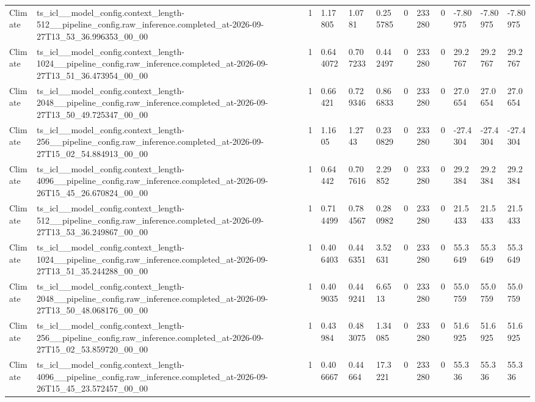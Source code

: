 \begin{tabular}{llllllllllll}
Climate & ts\_icl\_\_model\_config.context\_length-512\_\_pipeline\_config.raw\_inference.completed\_at-2026-09-27T13\_53\_36.996353\_00\_00 & 1 & 1.17805 & 1.0781 & 0.255785 & 0 & 233280 & 0 & -7.80975 & -7.80975 & -7.80975 \\
Climate & ts\_icl\_\_model\_config.context\_length-1024\_\_pipeline\_config.raw\_inference.completed\_at-2026-09-27T13\_51\_36.473954\_00\_00 & 1 & 0.644072 & 0.707233 & 0.442497 & 0 & 233280 & 0 & 29.2767 & 29.2767 & 29.2767 \\
Climate & ts\_icl\_\_model\_config.context\_length-2048\_\_pipeline\_config.raw\_inference.completed\_at-2026-09-27T13\_50\_49.725347\_00\_00 & 1 & 0.66421 & 0.729346 & 0.866833 & 0 & 233280 & 0 & 27.0654 & 27.0654 & 27.0654 \\
Climate & ts\_icl\_\_model\_config.context\_length-256\_\_pipeline\_config.raw\_inference.completed\_at-2026-09-27T15\_02\_54.884913\_00\_00 & 1 & 1.1605 & 1.2743 & 0.230829 & 0 & 233280 & 0 & -27.4304 & -27.4304 & -27.4304 \\
Climate & ts\_icl\_\_model\_config.context\_length-4096\_\_pipeline\_config.raw\_inference.completed\_at-2026-09-26T15\_45\_26.670824\_00\_00 & 1 & 0.64442 & 0.707616 & 2.29852 & 0 & 233280 & 0 & 29.2384 & 29.2384 & 29.2384 \\
Climate & ts\_icl\_\_model\_config.context\_length-512\_\_pipeline\_config.raw\_inference.completed\_at-2026-09-27T13\_53\_36.249867\_00\_00 & 1 & 0.714499 & 0.784567 & 0.280982 & 0 & 233280 & 0 & 21.5433 & 21.5433 & 21.5433 \\
Climate & ts\_icl\_\_model\_config.context\_length-1024\_\_pipeline\_config.raw\_inference.completed\_at-2026-09-27T13\_51\_35.244288\_00\_00 & 1 & 0.406403 & 0.446351 & 3.52631 & 0 & 233280 & 0 & 55.3649 & 55.3649 & 55.3649 \\
Climate & ts\_icl\_\_model\_config.context\_length-2048\_\_pipeline\_config.raw\_inference.completed\_at-2026-09-27T13\_50\_48.068176\_00\_00 & 1 & 0.409035 & 0.449241 & 6.6513 & 0 & 233280 & 0 & 55.0759 & 55.0759 & 55.0759 \\
Climate & ts\_icl\_\_model\_config.context\_length-256\_\_pipeline\_config.raw\_inference.completed\_at-2026-09-27T15\_02\_53.859720\_00\_00 & 1 & 0.43984 & 0.483075 & 1.34085 & 0 & 233280 & 0 & 51.6925 & 51.6925 & 51.6925 \\
Climate & ts\_icl\_\_model\_config.context\_length-4096\_\_pipeline\_config.raw\_inference.completed\_at-2026-09-26T15\_45\_23.572457\_00\_00 & 1 & 0.406667 & 0.44664 & 17.3221 & 0 & 233280 & 0 & 55.336 & 55.336 & 55.336 \\

\end{tabular}
